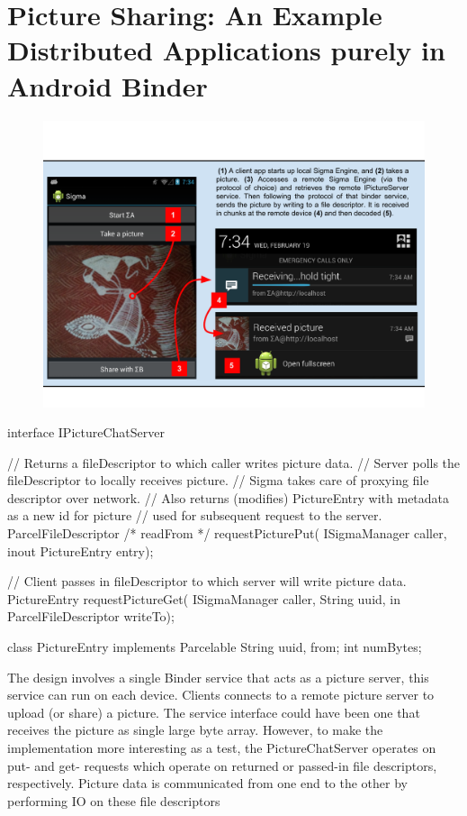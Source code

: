 \documentclass[prodmode]{acmlarge}
\begin{document}
\section{Picture Sharing: An Example Distributed Applications purely in Android Binder}
\label{sec:ExampleApplication}

\begin{figure}[h]
\centering
\includegraphics[width=\textwidth]{drawings/PictureChatExample.pdf}
\end{figure}

\begin{snippet}
interface IPictureChatServer {
  // Returns a fileDescriptor to which caller writes picture data.
  // Server polls the fileDescriptor to locally receives picture.
  // Sigma takes care of proxying file descriptor over network.
  // Also returns (modifies) PictureEntry with metadata as a new id for picture
  // used for subsequent request to the server.
  ParcelFileDescriptor /* readFrom */ requestPicturePut(
    ISigmaManager caller, inout PictureEntry entry);

  // Client passes in fileDescriptor to which server will write picture data.
  PictureEntry requestPictureGet(
    ISigmaManager caller, String uuid, in ParcelFileDescriptor writeTo);
}

class PictureEntry implements Parcelable {
    String uuid, from;
    int numBytes;
}
\end{snippet}

The design involves a single Binder service that acts as a picture server, this service can run on each device. Clients connects to a remote picture server to upload (or share) a picture. The service interface could have been one that receives the picture as single large byte array. However, to make the implementation more interesting as a test, the PictureChatServer operates on put- and get- requests which operate on returned or passed-in file descriptors, respectively. Picture data is communicated from one end to the other by performing IO on these file descriptors
\end{document}
